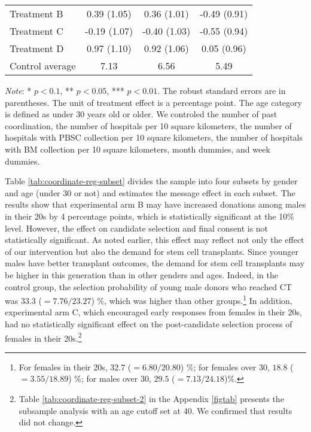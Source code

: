 \documentclass[12pt, a4paper]{article}
\begin{document}
\begin{table}
\begin{threeparttable}
\begin{tabular}[t]{lccc}
\hspace{1em}Treatment B & 0.39 (1.05) & 0.36 (1.01) & -0.49 (0.91)\\
\hspace{1em}Treatment C & -0.19 (1.07) & -0.40 (1.03) & -0.55 (0.94)\\
\hspace{1em}Treatment D & 0.97 (1.10) & 0.92 (1.06) & 0.05 (0.96)\\
\hspace{1em}Control average & 7.13 & 6.56 & 5.49\\
\bottomrule
\end{tabular}
\begin{tablenotes}
\item \emph{Note}: * $p < 0.1$, ** $p < 0.05$, *** $p < 0.01$. The robust standard errors are in parentheses. The unit of treatment effect is a percentage point. The age category is defined as under 30 years old or older. We controled the number of past coordination, the number of hospitals per 10 square kilometers, the number of hospitals with PBSC collection per 10 square kilometers, the number of hospitals with BM collection per 10 square kilometers, month dummies, and week dummies.
\end{tablenotes}
\end{threeparttable}
\end{table}

Table \ref{tab:coordinate-reg-subset} divides the sample into four subsets by gender and age (under 30 or not) and estimates the message effect in each subset. The results show that experimental arm B may have increased donations among males in their 20s by 4 percentage points, which is statistically significant at the 10\% level. However, the effect on candidate selection and final consent is not statistically significant. As noted earlier, this effect may reflect not only the effect of our intervention but also the demand for stem cell transplants. Since younger males have better transplant outcomes, the demand for stem cell transplants may be higher in this generation than in other genders and ages. Indeed, in the control group, the selection probability of young male donors who reached CT was \(33.3\) (\(=7.76/23.27\)) \%, which was higher than other groups.\footnote{For females in their 20s, \(32.7\) (\(=6.80 / 20.80\)) \%; for females over 30, \(18.8\) (\(=3.55 / 18.89\)) \%; for males over 30, \(29.5\) (\(=7.13/24.18\))\%.} In addition, experimental arm C, which encouraged early responses from females in their 20s, had no statistically significant effect on the post-candidate selection process of females in their 20s.\footnote{Table \ref{tab:coordinate-reg-subset-2} in the Appendix \ref{figtab} presents the subsample analysis with an age cutoff set at 40. We confirmed that results did not change.}
\end{document}
